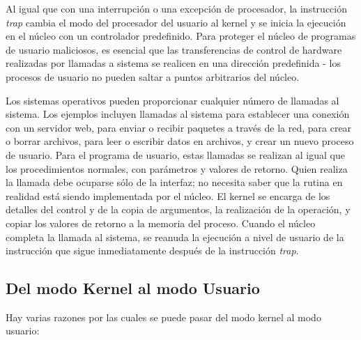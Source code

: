 \documentclass[10pt]{book}
\begin{document}
\begin{itemize}
Al igual que con una interrupción o una excepción de procesador, la instrucción \textit{trap} cambia el modo del procesador del usuario al kernel y se inicia la ejecución en el núcleo con un controlador predefinido. Para proteger el núcleo de programas de usuario maliciosos, es esencial que las transferencias de control de hardware realizadas por llamadas a sistema se realicen en una dirección predefinida - los procesos de usuario no pueden saltar a puntos arbitrarios del núcleo.

Los sistemas operativos pueden proporcionar cualquier número de llamadas al sistema. Los ejemplos incluyen llamadas al sistema para establecer una conexión con un servidor web, para enviar o recibir paquetes a través de la red, para crear o borrar archivos, para leer o escribir datos en archivos, y crear un nuevo proceso de usuario. Para el programa de usuario, estas llamadas se realizan al igual que los procedimientos normales, con parámetros y valores de retorno. Quien realiza la llamada debe ocuparse sólo de la interfaz; no necesita saber que la rutina en realidad está siendo implementada por el núcleo. El kernel se encarga de los detalles del control y de la copia de argumentos, la realización de la operación, y copiar los valores de retorno a la memoria del proceso. Cuando el núcleo completa la llamada al sistema, se reanuda la ejecución a nivel de usuario de la instrucción que sigue inmediatamente después de la instrucción \textit{trap}.
\end{itemize}

\subsection{Del modo Kernel al modo Usuario}
Hay varias razones por las cuales se puede pasar del modo kernel al modo usuario:
\end{document}
